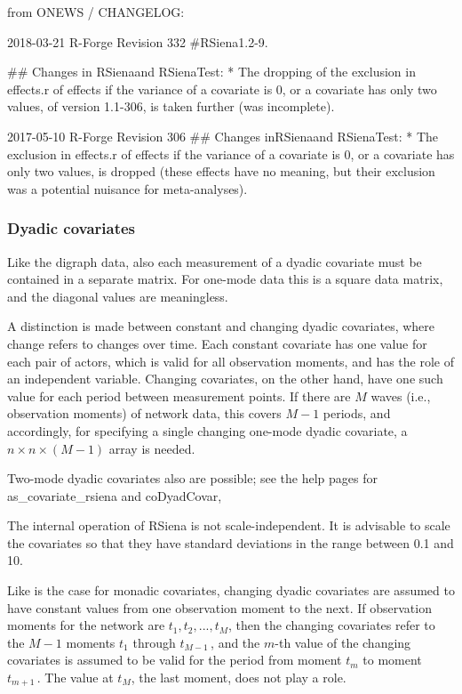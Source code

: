 \documentclass[a4paper,fleqn,11pt]{article}
\newcommand{\+}{\, + \,}
\newcommand{\sfn}[1]{\textsf{#1}}
\newcommand{\RS}{{\sf \textsf{RSiena} }}
\begin{document}
from ONEWS / CHANGELOG:

2018-03-21 R-Forge Revision 332
#\textsf{RSiena}1.2-9.

## Changes in \textsf{RSiena}and RSienaTest:
   * The dropping of the exclusion in effects.r of effects if the variance of a
     covariate is 0, or a covariate has only two values, of version 1.1-306,
     is  taken further (was incomplete).

2017-05-10 R-Forge Revision 306
## Changes in\textsf{RSiena}and \textsf{RSienaTest}:
   * The exclusion in effects.r of effects if the variance of a covariate is 0,
     or a covariate has only two values, is dropped (these effects have no
     meaning, but their exclusion was a potential nuisance for meta-analyses).
\fi



\subsubsection{Dyadic covariates}

Like the digraph data, also each measurement of a dyadic covariate
must be contained in a separate matrix.
For one-mode data this is a square data matrix,
and the diagonal values are meaningless.

A distinction is made between constant and changing dyadic
covariates, where change refers to changes over time. Each constant
covariate has one value for each pair of actors, which is valid for
all observation moments, and has the role of an independent
variable. Changing covariates, on the other hand, have one such
value for each period between measurement points. If there are $M$
waves (i.e., observation moments) of network data,
this covers $M-1$ periods, and accordingly,
for specifying a single changing one-mode dyadic covariate,
a $n \times n \times (M-1)$ array is needed.

Two-mode dyadic covariates also are possible; see the help pages for
\sfn{as\_covariate\_rsiena} and \sfn{coDyadCovar},

The internal operation of \RS is not scale-independent.
It is advisable to scale the covariates so that they have
standard deviations in the range between 0.1 and 10.

Like is the case for monadic  covariates,
changing dyadic covariates are assumed to have constant values from one
observation moment to the next. If observation moments for the
network are $t_1, t_2, ..., t_M$, then the changing covariates
refer to the $M-1$ moments $t_1$ through $t_{M-1}\,$, and
the $m$-th value of the changing covariates is assumed to be valid
for the period from moment $t_m$ to moment $t_{m+1}\,$.
The value at $t_M$, the last moment, does not play a role.
\end{document}

